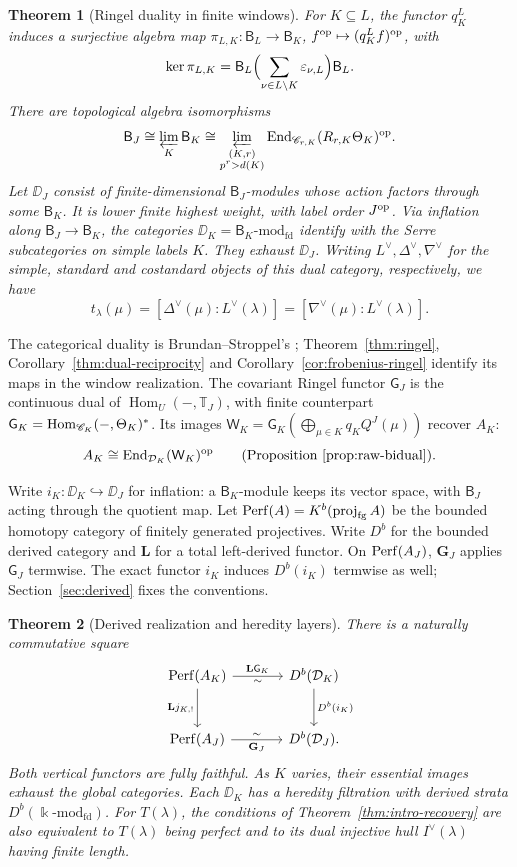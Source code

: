 \documentclass[11pt,reqno]{amsart}
\newcommand{\kk}{\Bbbk}\newcommand{\ZZ}{\mathbb Z}\newcommand{\NN}{\mathbb N}
\newcommand{\Hom}{\operatorname{Hom}}\newcommand{\End}{\operatorname{End}}\newcommand{\Ext}{\operatorname{Ext}}
\newcommand{\BJ}{\mathsf B_J}\newcommand{\BK}{\mathsf B_K}\newcommand{\TJ}{\mathbb T_J}\newcommand{\GK}{\mathsf G_K}\newcommand{\GJ}{\mathsf G_J}
\newtheorem{theorem}{Theorem}[section]
\theoremstyle{definition}
\theoremstyle{remark}
\numberwithin{equation}{section}
\begin{document}
\begin{theorem}[Ringel duality in finite windows]\label{thm:intro-ringel}
For $K\subseteq L$, the functor $q_K^L$ induces a surjective algebra map
$\pi_{L,K}:\mathsf B_L\to\BK$, $f^{\mathrm{op}}\mapsto(q_K^Lf)^{\mathrm{op}}$, with
\[
 \ker\pi_{L,K}=\mathsf B_L
       \Bigl(\sum_{\nu\in L\setminus K}\varepsilon_{\nu,L}\Bigr)
       \mathsf B_L.
\]
There are topological algebra isomorphisms
\[
 \BJ\cong\varprojlim_K\BK
 \cong\varprojlim_{\substack{(K,r)\\p^r>d(K)}}
     \End_{\CC_{r,K}}(R_{r,K}\Theta_K)^{\op}.
\]
Let $\DD_J$ consist of finite-dimensional $\BJ$-modules whose
action factors through some $\BK$. It is lower finite highest weight,
with label order $J^{\mathrm{op}}$. Via inflation along $\BJ\to\BK$, the
categories $\DD_K=\BK\text{-}\mathrm{mod}_{\mathrm{fd}}$ identify
with the Serre subcategories on simple labels $K$. They exhaust
$\DD_J$. Writing $L^\vee,\Delta^\vee,\nabla^\vee$ for the simple,
standard and costandard objects of this dual category, respectively,
we have
\[
 t_\lambda(\mu)
   =[\Delta^\vee(\mu):L^\vee(\lambda)]
   =[\nabla^\vee(\mu):L^\vee(\lambda)].
\]
\end{theorem}

The categorical duality is Brundan--Stroppel's \cite{BS};
Theorem~\ref{thm:ringel}, Corollary~\ref{thm:dual-reciprocity}
and Corollary~\ref{cor:frobenius-ringel} identify its maps in the
window realization. The covariant Ringel functor $\GJ$ is the
continuous dual of $\Hom_U(-,\TJ)$, with finite counterpart
$\GK=\Hom_{\CC_K}(-,\Theta_K)^*$. Its images
$\mathsf W_K=\GK(\bigoplus_{\mu\in K}q_KQ^J(\mu))$
recover $A_K$:
\[
 A_K\cong\End_{\DD_K}(\mathsf W_K)^{\op}
 \qquad\text{(Proposition~\ref{prop:raw-bidual}).}
\]

Write $i_K:\DD_K\hookrightarrow\DD_J$ for inflation: a $\BK$-module
keeps its vector space, with $\BJ$ acting through the quotient map.
Let $\operatorname{Perf}(A)=K^b(\operatorname{proj}_{\mathrm{fg}}A)$ be the bounded
homotopy category of finitely generated projectives.
Write $D^b$ for the bounded derived category and $\mathbf L$ for
a total left-derived functor. On $\operatorname{Perf}(A_J)$, $\mathbf G_J$
applies $\GJ$ termwise. The exact functor $i_K$ induces $D^b(i_K)$
termwise as well; Section~\ref{sec:derived} fixes the conventions.

\begin{theorem}[Derived realization and heredity layers]\label{thm:intro-derived}
There is a naturally commutative square
\[
\begin{tikzcd}[column sep=large,row sep=large]
 \Perf(A_K)\arrow[r,"\mathbf L\GK","\sim"']
             \arrow[d,"\mathbf L j_{K,!}"']&
 D^b(\DD_K)\arrow[d,"D^b(i_K)"]\\
 \Perf(A_J)\arrow[r,"\mathbf G_J"',"\sim"]&
 D^b(\DD_J).
\end{tikzcd}
\]
Both vertical functors are fully faithful. As $K$ varies, their
essential images exhaust the global categories. Each $\DD_K$ has a heredity
filtration with derived strata $D^b(\kk\text{-}\mathrm{mod}_{\mathrm{fd}})$.
For $T(\lambda)$, the conditions of Theorem~\ref{thm:intro-recovery}
are also equivalent to $T(\lambda)$ being perfect and to its dual
injective hull $I^\vee(\lambda)$ having finite length.
\end{theorem}
\end{document}
